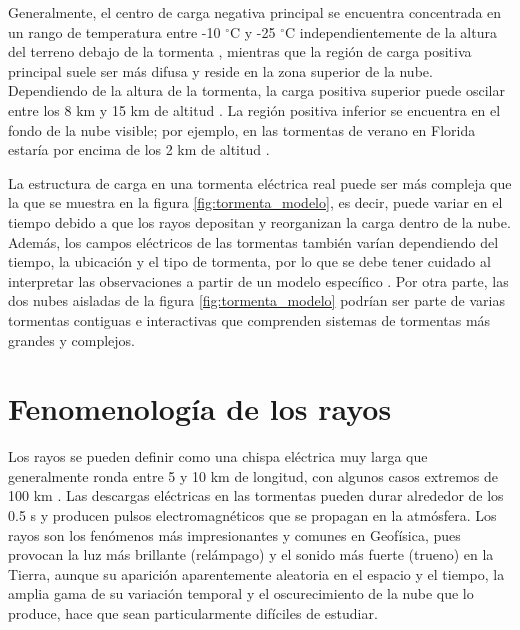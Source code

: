 \documentclass[11pt,oneside,openany,letter]{book}
\begin{document}
Generalmente, el centro de carga negativa principal se encuentra concentrada en un rango de temperatura entre -10 $^{\circ}$C y -25 $^{\circ}$C independientemente de la altura del terreno debajo de la tormenta \cite{RakovEtal2003}, mientras que la región de carga positiva principal suele ser más difusa y reside en la zona superior de la nube. Dependiendo de la altura de la tormenta, la carga positiva superior puede oscilar entre los 8 km y 15 km de altitud \cite{DwyerUman2014}. La región positiva inferior se encuentra en el fondo de la nube visible; por ejemplo, en las tormentas de verano en Florida estaría por encima de los 2 km de altitud \cite{DwyerUman2014}. 





La estructura de carga en una tormenta eléctrica real puede ser más compleja que la que se muestra en la figura \ref{fig:tormenta_modelo}, es decir, puede variar en el tiempo debido a que los rayos depositan y reorganizan la carga dentro de la nube. Además, los campos eléctricos de las tormentas también varían dependiendo del tiempo, la ubicación y el tipo de tormenta, por lo que se debe tener cuidado al interpretar las observaciones a partir de un modelo específico \cite{DwyerUman2014}. Por otra parte, las dos nubes aisladas de la figura \ref{fig:tormenta_modelo} podrían ser parte de varias tormentas contiguas e interactivas que comprenden sistemas de tormentas más grandes y complejos. 



\section{Fenomenología de los rayos}\label{fenomenologia}
Los rayos se pueden definir como una chispa eléctrica muy larga que generalmente ronda entre 5 y 10 km de longitud, con algunos casos extremos de 100 km \cite{DwyerUman2014}. Las descargas eléctricas en las tormentas pueden durar alrededor de los 0.5 s \cite{DwyerUman2014} y producen pulsos electromagnéticos que se propagan en la atmósfera. Los rayos son los fenómenos más impresionantes y comunes en Geofísica, pues provocan la luz más brillante (relámpago) y el sonido más fuerte (trueno) en la Tierra, aunque su aparición aparentemente aleatoria en el espacio y el tiempo, la amplia gama de su variación temporal y el oscurecimiento de la nube que lo produce, hace que sean particularmente difíciles de estudiar.
\end{document}
